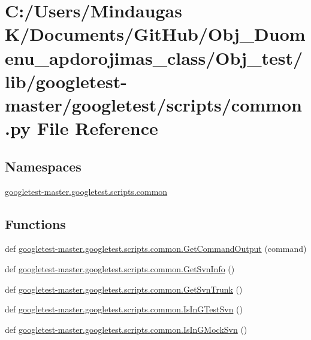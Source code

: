 \hypertarget{_obj__test_2lib_2googletest-master_2googletest_2scripts_2common_8py}{}\section{C\+:/\+Users/\+Mindaugas K/\+Documents/\+Git\+Hub/\+Obj\+\_\+\+Duomenu\+\_\+apdorojimas\+\_\+class/\+Obj\+\_\+test/lib/googletest-\/master/googletest/scripts/common.py File Reference}
\label{_obj__test_2lib_2googletest-master_2googletest_2scripts_2common_8py}
\subsection*{Namespaces}
\begin{DoxyCompactItemize}
\item 
 \mbox{\hyperlink{namespacegoogletest-master_1_1googletest_1_1scripts_1_1common}{googletest-\/master.\+googletest.\+scripts.\+common}}
\end{DoxyCompactItemize}
\subsection*{Functions}
\begin{DoxyCompactItemize}
\item 
def \mbox{\hyperlink{namespacegoogletest-master_1_1googletest_1_1scripts_1_1common_abc2f36cbd8e31faeb41df1fd97b97329}{googletest-\/master.\+googletest.\+scripts.\+common.\+Get\+Command\+Output}} (command)
\item 
def \mbox{\hyperlink{namespacegoogletest-master_1_1googletest_1_1scripts_1_1common_a0c60472d48d9631946afb3eeff31143c}{googletest-\/master.\+googletest.\+scripts.\+common.\+Get\+Svn\+Info}} ()
\item 
def \mbox{\hyperlink{namespacegoogletest-master_1_1googletest_1_1scripts_1_1common_aa7aa99301116457c7b68b3a9e647872e}{googletest-\/master.\+googletest.\+scripts.\+common.\+Get\+Svn\+Trunk}} ()
\item 
def \mbox{\hyperlink{namespacegoogletest-master_1_1googletest_1_1scripts_1_1common_ae09cf11a8f3c9d3a75a2774ce351ef6f}{googletest-\/master.\+googletest.\+scripts.\+common.\+Is\+In\+G\+Test\+Svn}} ()
\item 
def \mbox{\hyperlink{namespacegoogletest-master_1_1googletest_1_1scripts_1_1common_acc94b6b10194aacdf1442a347210a119}{googletest-\/master.\+googletest.\+scripts.\+common.\+Is\+In\+G\+Mock\+Svn}} ()
\end{DoxyCompactItemize}

